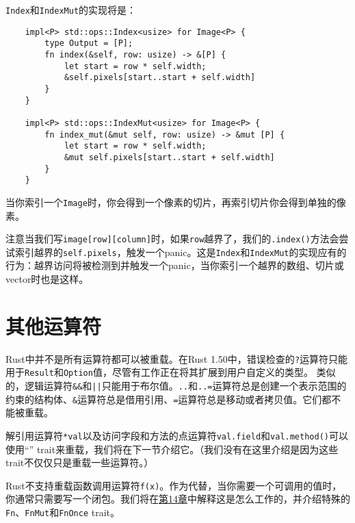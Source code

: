 \texttt{Index}和\texttt{IndexMut}的实现将是：
\begin{verbatim}
    impl<P> std::ops::Index<usize> for Image<P> {
        type Output = [P];
        fn index(&self, row: usize) -> &[P] {
            let start = row * self.width;
            &self.pixels[start..start + self.width]
        }
    }

    impl<P> std::ops::IndexMut<usize> for Image<P> {
        fn index_mut(&mut self, row: usize) -> &mut [P] {
            let start = row * self.width;
            &mut self.pixels[start..start + self.width]
        }
    }
\end{verbatim}

当你索引一个\texttt{Image}时，你会得到一个像素的切片，再索引切片你会得到单独的像素。

注意当我们写\texttt{image[row][column]}时，如果\texttt{row}越界了，我们的\texttt{.index()}方法会尝试索引越界的\texttt{self.pixels}，触发一个panic。这是\texttt{Index}和\texttt{IndexMut}的实现应有的行为：越界访问将被检测到并触发一个panic，当你索引一个越界的数组、切片或vector时也是这样。

\section{其他运算符}

Rust中并不是所有运算符都可以被重载。在Rust 1.50中，错误检查的\texttt{?}运算符只能用于\texttt{Result}和\texttt{Option}值，尽管有工作正在将其扩展到用户自定义的类型。 类似的，逻辑运算符\texttt{\&\&}和\texttt{||}只能用于布尔值。\texttt{..}和\texttt{..=}运算符总是创建一个表示范围的约束的结构体、\texttt{\&}运算符总是借用引用、\texttt{=}运算符总是移动或者拷贝值。它们都不能被重载。

解引用运算符\texttt{*val}以及访问字段和方法的点运算符\texttt{val.field}和\texttt{val.method()}可以使用“” trait来重载，我们将在下一节介绍它。（我们没有在这里介绍是因为这些trait不仅仅只是重载一些运算符。）

Rust不支持重载函数调用运算符\texttt{f(x)}。作为代替，当你需要一个可调用的值时，你通常只需要写一个闭包。我们将在\hyperref[ch14]{第14章}中解释这是怎么工作的，并介绍特殊的\texttt{Fn}、\texttt{FnMut}和\texttt{FnOnce} trait。
